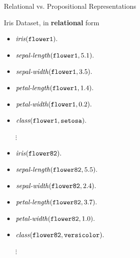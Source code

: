 \documentclass[presentation]{beamer}\mode<presentation>{\usetheme{AMSBolognaFC}}
\begin{document}
\begin{frame}[allowframebreaks]{Relational vs. Propositional Representations}
    \begin{exampleblock}{Iris Dataset, in \textbf{relational} form}
        \begin{multicols}{2}
            \begin{itemize}
                \item $\text{\textit{iris}}(\mathtt{flower1}) \mathtt{.}$
                \item $\text{\textit{sepal-length}}(\mathtt{flower1}, 5.1) \mathtt{.}$
                \item $\text{\textit{sepal-width}}(\mathtt{flower1}, 3.5) \mathtt{.}$
                \item $\text{\textit{petal-length}}(\mathtt{flower1}, 1.4) \mathtt{.}$
                \item $\text{\textit{petal-width}}(\mathtt{flower1}, 0.2) \mathtt{.}$
                \item $\text{\textit{class}}(\mathtt{flower1}, \mathtt{setosa}) \mathtt{.}$
                \item[$\vdots$]
                \item $\text{\textit{iris}}(\mathtt{flower82}) \mathtt{.}$
                \item $\text{\textit{sepal-length}}(\mathtt{flower82}, 5.5) \mathtt{.}$
                \item $\text{\textit{sepal-width}}(\mathtt{flower82}, 2.4) \mathtt{.}$
                \item $\text{\textit{petal-length}}(\mathtt{flower82}, 3.7) \mathtt{.}$
                \item $\text{\textit{petal-width}}(\mathtt{flower82}, 1.0) \mathtt{.}$
                \item $\text{\textit{class}}(\mathtt{flower82}, \mathtt{versicolor}) \mathtt{.}$
                \item[$\vdots$]
            \end{itemize}
        \end{multicols}
    \end{exampleblock}
\end{frame}
\end{document}
